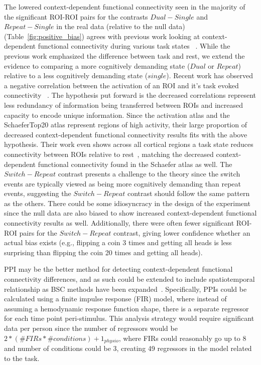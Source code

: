 \documentclass[phd,appendix,figures]{uithesis}
\begin{document}
The lowered context-dependent functional connectivity seen in the majority of the 
significant ROI-ROI pairs for the contrasts
$Dual - Single$ and $Repeat - Single$ in the real data (relative to the null data)
(Table~\ref{fig:positive_bias}) agrees with previous work looking at
context-dependent functional connectivity during various task states
~\cite{Cole2014a,Spadone2015,Di2019a,He2013,Ito2019,Hearne2020}.
While the previous work emphasized the difference between task and rest, we extend
the evidence to comparing a more cognitively demanding state ($Dual$ or $Repeat$)
relative to a less cognitively demanding state ($single$).
Recent work has observed a negative correlation between the activation of an ROI
and it's task evoked connectivity ~\cite{Hearne2020}.
The hypothesis put forward is the decreased correlations represent less redundancy of
information being transferred between ROIs and increased capacity to encode unique information.
Since the activation atlas and the SchaeferTop20 atlas represent
regions of high activity, their large proportion of decreased context-dependent functional connectivity results
fits with the above hypothesis.
Their work even shows across all cortical regions a task state reduces connectivity between ROIs relative to rest~\cite{Ito2019},
matching the decreased context-dependent functional connectivity found in the Schaefer atlas as well.
The $Switch - Repeat$ contrast presents a challenge to the theory since
the switch events are typically viewed as being more cognitively demanding than repeat events,
suggesting the $Switch - Repeat$ contrast should follow the same pattern as the others.
There could be some idiosyncracy in the design of the experiment since the null data are also
biased to show increased context-dependent functional connectivity results as well.
Additionally, there were often fewer significant ROI-ROI pairs for the $Switch - Repeat$ contrast,
giving lower confidence whether an actual bias exists (e.g., flipping a coin 3 times and getting all heads
is less surprising than flipping the coin 20 times and getting all heads).

PPI may be the better method for detecting context-dependent functional connectivity
differences, and as such could be extended to include spatiotemporal relationship as BSC methods
have been expanded~\cite{Turner2012a}.
Specifically, PPIs could be calculated using a finite impulse response (FIR) model, where instead of assuming
a hemodynamic response function shape, there is a separate regressor for each time point peri-stimulus.
This analysis strategy would require significant data per person since the number of regressors would be
$2 * (\#FIRs * \#conditions) + 1_{physio}$, where FIRs could reasonably go up to 8 and number of conditions could
be 3, creating 49 regressors in the model related to the task.
\end{document}
